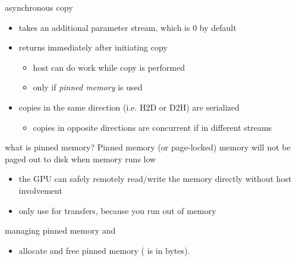 \begin{frame}[fragile]{}

    \begin{info}{asynchronous copy}
        \centering {}
        \begin{itemize}
            \item takes an additional parameter stream, which is 0 by default
            \item returns immediately after initiating copy
            \begin{itemize}
                \item host can do work while copy is performed
                \item only if \emph{pinned memory} is used
            \end{itemize}
            \item copies in the same direction (i.e. H2D or D2H) are serialized
            \begin{itemize}
                \item copies in opposite directions are concurrent if in different streams
            \end{itemize}
        \end{itemize}
    \end{info}

\end{frame}

\begin{frame}[fragile]{}
    \begin{info}{what is pinned memory?}
        Pinned memory (or page-locked) memory will not be paged out to disk when memory runs low
        \begin{itemize}
            \item the GPU can safely remotely read/write the memory directly without host involvement
            \item only use for transfers, because you run out of memory
        \end{itemize}
    \end{info}

    \begin{info}{managing pinned memory}
        \centering {} and 
        \begin{itemize}
            \item allocate and free pinned memory ( is in bytes).
        \end{itemize}
    \end{info}

\end{frame}

